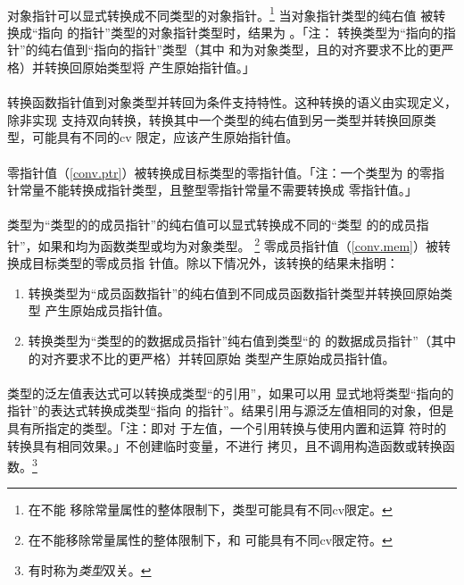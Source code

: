 \paragraph{}
对象指针可以显式转换成不同类型的对象指针。\footnote{在不能
移除常量属性的整体限制下，类型可能具有不同cv限定。} 当对象指针类型的纯右值
被转换成``指向 的指针''类型的对象指针类型时，结果为
  。「注：
转换类型为``指向的指针''的纯右值到``指向的指针''类型（其中
和为对象类型，且的对齐要求不比的更严格）并转换回原始类型将
产生原始指针值。」

\paragraph{}
转换函数指针值到对象类型并转回为条件支持特性。这种转换的语义由实现定义，除非实现
支持双向转换，转换其中一个类型的纯右值到另一类型并转换回原类型，可能具有不同的cv
限定，应该产生原始指针值。

\paragraph{}
零指针值（\ref{conv.ptr}）被转换成目标类型的零指针值。「注：一个类型为
的零指针常量不能转换成指针类型，且整型零指针常量不需要转换成
零指针值。」

\paragraph{}
类型为``类型的的成员指针''的纯右值可以显式转换成不同的``类型
的的成员指针''，如果和均为函数类型或均为对象类型。
\footnote{在不能移除常量属性的整体限制下，和
可能具有不同cv限定符。} 零成员指针值（\ref{conv.mem}）被转换成目标类型的零成员指
针值。除以下情况外，该转换的结果未指明：
\begin{enumerate}
  \item{转换类型为``成员函数指针''的纯右值到不同成员函数指针类型并转换回原始类型
    产生原始成员指针值。}
  \item{转换类型为``类型的的数据成员指针''纯右值到类型``的
    的数据成员指针''（其中的对齐要求不比的更严格）并转回原始
    类型产生原始成员指针值。}
\end{enumerate}

\paragraph{}
类型的泛左值表达式可以转换成类型``的引用''，如果可以用
显式地将类型``指向的指针''的表达式转换成类型``指向
的指针''。结果引用与源泛左值相同的对象，但是具有所指定的类型。「注：即对
于左值，一个引用转换与使用内置\tm{\&}和\tm{*}运算
符时的转换具有相同效果。」不创建临时变量，不进行
拷贝，且不调用构造函数或转换函数。\footnote{有时称为\textit{类型}双关。}

